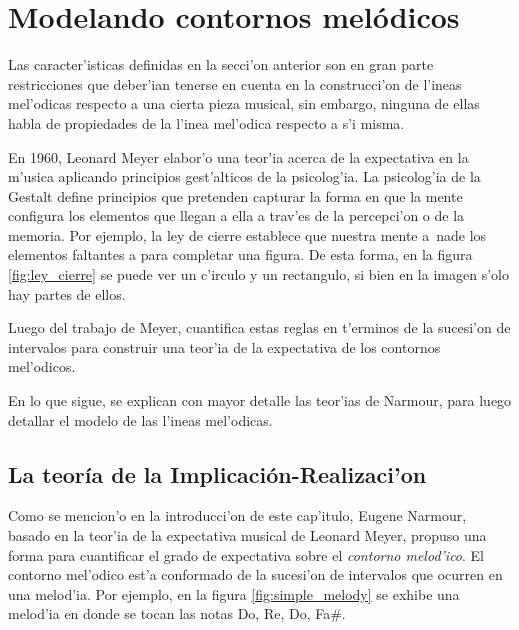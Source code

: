 \section{Modelando contornos mel\'odicos}
\label{sec:melodic_contour}
Las caracter'isticas definidas en la secci'on anterior son en gran parte restricciones que deber'ian tenerse en cuenta en la construcci'on 
de l'ineas mel'odicas respecto a una cierta pieza musical, sin embargo, ninguna de ellas habla de propiedades de la l'inea mel'odica 
respecto a s'i misma.

En 1960, Leonard Meyer elabor'o una teor'ia acerca de la expectativa en la m'usica aplicando principios gest'alticos de la psicolog'ia. La 
psicolog'ia de la Gestalt define principios que pretenden capturar la forma en que la mente configura los elementos que llegan a ella a trav'es 
de la percepci'on o de la memoria. Por ejemplo, la ley de cierre establece que nuestra mente a~nade los elementos faltantes a para completar una 
figura. De esta forma, en la figura \ref{fig:ley_cierre} se puede ver un c'irculo y un rectangulo, si bien en la imagen s'olo hay partes de ellos.

\begin{imagen}
    \width{6cm}
\end{imagen}

Luego del trabajo de Meyer, \citep{Narmour91} cuantifica estas reglas en t'erminos de la sucesi'on de intervalos para construir una teor'ia de 
la expectativa de los contornos mel'odicos. 

En lo que sigue, se explican con mayor detalle las teor'ias de Narmour, para luego detallar el modelo de las l'ineas mel'odicas.

\subsection{La teor\'ia de la Implicaci\'on-Realizaci'on}
Como se mencion'o en la introducci'on de este cap'itulo, Eugene Narmour, basado en la teor'ia de la expectativa musical de Leonard Meyer, propuso una forma para cuantificar
el grado de expectativa sobre el \emph{contorno melod'ico}. El contorno mel'odico est'a conformado de la sucesi'on de intervalos que ocurren en una melod'ia. Por ejemplo, 
en la figura \ref{fig:simple_melody} se exhibe una melod'ia en donde se tocan las notas Do, Re, Do, Fa\#. 

